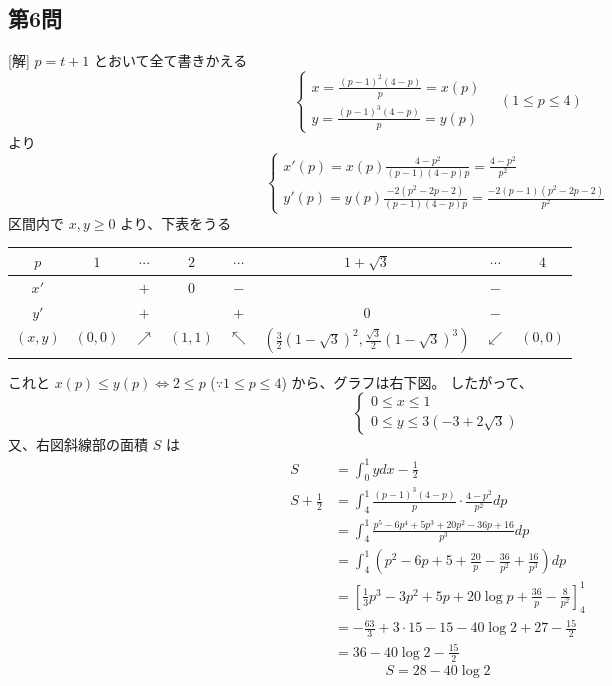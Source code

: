 \documentclass[../main.tex]{subfiles}
\begin{document}
\subsection*{第6問}
[解] $p = t+1$ とおいて全て書きかえる
$$
\begin{cases} x = \frac{(p-1)^2(4-p)}{p} = x(p) \\ y = \frac{(p-1)^3(4-p)}{p} = y(p)
\end{cases} \quad (1 \le p \le 4) $$
より
$$
\begin{cases} x'(p) = x(p) \frac{4-p^2}{(p-1)(4-p)p} = \frac{4-p^2}{p^2} \\ y'(p) = y(p) \frac{-2(p^2-2p-2)}{(p-1)(4-p)p} = \frac{-2(p-1)(p^2-2p-2)}{p^2}
\end{cases} $$
区間内で $x, y \ge 0$ より、下表をうる
\begin{center}
  \begin{tabular}{|c|c|c|c|c|c|c|c|}
    \hline
    $p$ & $1$ & $\cdots$ & $2$ & $\cdots$ & $1+\sqrt{3}$ & $\cdots$ & $4$ \\
    \hline
    $x'$ & & $+$ & $0$ & $-$ & & $-$ & \\
    \hline
    $y'$ & & $+$ & & $+$ & $0$ & $-$ & \\
    \hline
    $(x, y)$ & $(0, 0)$ & $\nearrow$ & $(1, 1)$ & $\nwarrow$ & $(\frac{3}{2}(1-\sqrt{3})^2, \frac{\sqrt{3}}{2}(1-\sqrt{3})^3)$ & $\swarrow$ & $(0, 0)$ \\
    \hline
  \end{tabular}
\end{center}
これと $x(p) \le y(p) \iff 2 \le p$ ($\because 1 \le p \le 4$) から、グラフは右下図。
したがって、
$$
\begin{cases} 0 \le x \le 1 \\ 0 \le y \le 3(-3+2\sqrt{3})
\end{cases} $$
又、右図斜線部の面積 $S$ は
\begin{align*}
  S &= \int_0^1 y dx - \frac{1}{2} \\
  S + \frac{1}{2} &= \int_4^1 \frac{(p-1)^3(4-p)}{p} \cdot \frac{4-p^2}{p^2} dp \\
  &= \int_4^1 \frac{p^5 - 6p^4 + 5p^3 + 20p^2 - 36p + 16}{p^3} dp \\
  &= \int_4^1 \left( p^2 - 6p + 5 + \frac{20}{p} - \frac{36}{p^2} + \frac{16}{p^3} \right) dp \\
  &= \left[ \frac{1}{3}p^3 - 3p^2 + 5p + 20 \log p + \frac{36}{p} - \frac{8}{p^2} \right]_4^1 \\
  &= -\frac{63}{3} + 3 \cdot 15 - 15 - 40 \log 2 + 27 - \frac{15}{2} \\
  &= 36 - 40 \log 2 - \frac{15}{2}
\end{align*}
$$ S = 28 - 40 \log 2 $$

\begin{center}
\end{center}
\end{document}
